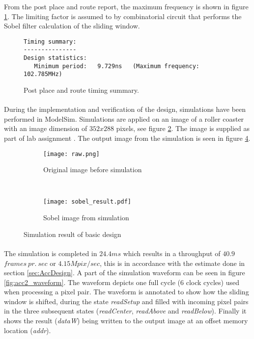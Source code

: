 From the post place and route report, the maximum frequency is shown in figure \ref{fig:sum_PostPAR_report}. The limiting factor is assumed to by combinatorial circuit that performs the Sobel filter calculation of the sliding window. 

\begin{figure}[H]
\centering
\small
\begin{BVerbatim}
Timing summary:
---------------
Design statistics:
   Minimum period:   9.729ns   (Maximum frequency: 102.785MHz)
\end{BVerbatim}
\caption{Post place and route timing summary.}
\label{fig:sum_PostPAR_report}
\end{figure}

\paragraph*{}
During the implementation and verification of the design, simulations have been performed in ModelSim. Simulations are applied on an image of a roller coaster with an image dimension of $352x288$ pixels, see figure \ref{fig:test_picture_raw}. The image is supplied as part of lab assignment \cite{Sparsoe2014}. The output image from the simulation is seen in figure \ref{fig:test_picture_sobel}.

\begin{figure}[H]
	\centering
	\begin{subfigure}[b]{0.4\textwidth}
		\texttt{[image: raw.png]}
		\caption{Original image before simulation}
		\label{fig:test_picture_raw}
    \end{subfigure}%
        ~ %
    \begin{subfigure}[b]{0.4\textwidth}
    	\texttt{[image: sobel\_result.pdf]}
    	\caption{Sobel image from simulation}
    	\label{fig:test_picture_sobel}
	\end{subfigure}
	\caption{Simulation result of basic design}
\end{figure}

\paragraph*{}
The simulation is completed in $24.4ms$ which results in a throughput of $40.9$ $frames~pr.~sec$ or $4.15Mpix/sec$, this is in accordance with the estimate done in section \ref{sec:AccDesign}. A part of the simulation waveform can be seen in figure \ref{fig:acc2_waveform}. The waveform depicts one full cycle (6 clock cycles) used when processing a pixel pair. The waveform is annotated to show how the sliding window is shifted, during the state \emph{readSetup} and filled with incoming pixel pairs in the three subsequent states (\emph{readCenter}, \emph{readAbove} and \emph{readBelow}). Finally it shows the result (\emph{dataW}) being written to the output image at an offset memory location (\emph{addr}).

